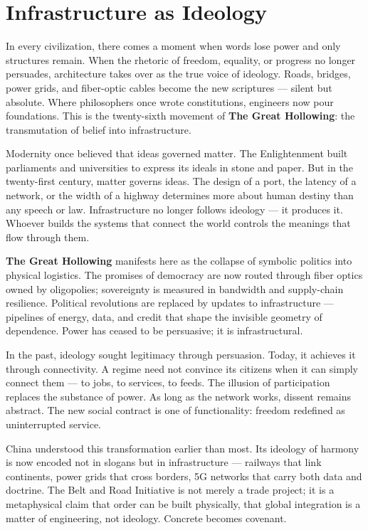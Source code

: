 \documentclass[11pt,twoside]{book}
\begin{document}
% 
\chapter{Infrastructure as Ideology}
\label{ch:27}

In every civilization, there comes a moment when words lose power and only structures remain.  
When the rhetoric of freedom, equality, or progress no longer persuades, architecture takes over as the true voice of ideology.  Roads, bridges, power grids, and fiber-optic cables become the new scriptures — silent but absolute.  Where philosophers once wrote constitutions, engineers now pour foundations.  This is the twenty-sixth movement of \textbf{The Great Hollowing}: the transmutation of belief into infrastructure.

Modernity once believed that ideas governed matter.  The Enlightenment built parliaments and universities to express its ideals in stone and paper.  But in the twenty-first century, matter governs ideas.  The design of a port, the latency of a network, or the width of a highway determines more about human destiny than any speech or law.  Infrastructure no longer follows ideology — it produces it.  Whoever builds the systems that connect the world controls the meanings that flow through them.

\textbf{The Great Hollowing} manifests here as the collapse of symbolic politics into physical logistics.  The promises of democracy are now routed through fiber optics owned by oligopolies; sovereignty is measured in bandwidth and supply-chain resilience.  Political revolutions are replaced by updates to infrastructure — pipelines of energy, data, and credit that shape the invisible geometry of dependence.  Power has ceased to be persuasive; it is infrastructural.

In the past, ideology sought legitimacy through persuasion.  Today, it achieves it through connectivity.  A regime need not convince its citizens when it can simply connect them — to jobs, to services, to feeds.  The illusion of participation replaces the substance of power.  As long as the network works, dissent remains abstract.  The new social contract is one of functionality: freedom redefined as uninterrupted service.

China understood this transformation earlier than most.  Its ideology of harmony is now encoded not in slogans but in infrastructure — railways that link continents, power grids that cross borders, 5G networks that carry both data and doctrine.  The Belt and Road Initiative is not merely a trade project; it is a metaphysical claim that order can be built physically, that global integration is a matter of engineering, not ideology.  Concrete becomes covenant.
\end{document}
